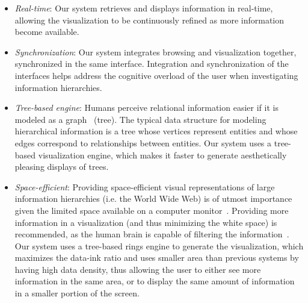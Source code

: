 \documentclass[10pt,psfig]{article}
\begin{document}
\begin{itemize}

\item {\em Real-time}: %
Our system retrieves and displays information in real-time, allowing the visualization to be continuously refined as more information become available.

\item {\em Synchronization}: %
Our system integrates browsing and visualization together, synchronized in the same interface.
Integration and synchronization of the interfaces helps address the cognitive overload of the user when investigating information hierarchies.

\item {\em Tree-based engine}: Humans perceive relational information easier if it is modeled as a graph~\cite{dett-gd-99} (tree).
The typical data structure for modeling hierarchical information is a tree whose vertices represent entities and whose edges correspond to relationships between entities.
Our system uses a tree-based visualization engine, which makes it faster to generate aesthetically pleasing displays of trees.

\item {\em Space-efficient}: Providing space-efficient visual representations of large information hierarchies (i.e. the World Wide Web) is of utmost importance given the limited space available on a computer monitor~\cite{rahj04}.
Providing more information in a visualization (and thus minimizing the white space) is recommended, as the human brain is capable of filtering the information~\cite{t-01}.
Our system uses a tree-based rings engine to generate the visualization, which maximizes the data-ink ratio and uses smaller area than previous systems by having high data density, thus allowing the user to either see more information in the same area, or to display the same amount of information in a smaller portion of the screen.


\end{itemize}
\end{document}
